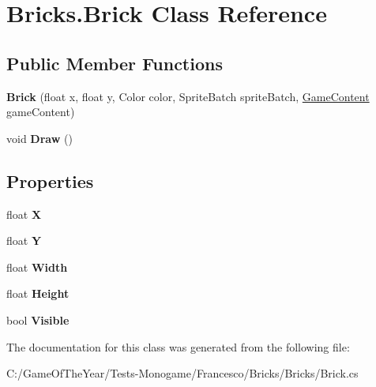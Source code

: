\hypertarget{class_bricks_1_1_brick}{}\section{Bricks.\+Brick Class Reference}
\label{class_bricks_1_1_brick}
\subsection*{Public Member Functions}
\begin{DoxyCompactItemize}
\item 
\mbox{\label{class_bricks_1_1_brick_ab67afcce321484d68712facf3a01e6d1}} 
{\bfseries Brick} (float x, float y, Color color, Sprite\+Batch sprite\+Batch, \mbox{\hyperlink{class_bricks_1_1_game_content}{Game\+Content}} game\+Content)
\item 
\mbox{\label{class_bricks_1_1_brick_a096850eb0e6b34dccc03fa82e26fc7e5}} 
void {\bfseries Draw} ()
\end{DoxyCompactItemize}
\subsection*{Properties}
\begin{DoxyCompactItemize}
\item 
\mbox{\label{class_bricks_1_1_brick_ad32b8576b81c39c29f036ae4899497c5}} 
float {\bfseries X}
\item 
\mbox{\label{class_bricks_1_1_brick_af39fbdf9515c40b8e0079a1ee31b9c31}} 
float {\bfseries Y}
\item 
\mbox{\label{class_bricks_1_1_brick_a95e8bf57566472909a1c2e2d78f7ddfd}} 
float {\bfseries Width}
\item 
\mbox{\label{class_bricks_1_1_brick_a72887db43fa21ed44f69d345ce44dee0}} 
float {\bfseries Height}
\item 
\mbox{\label{class_bricks_1_1_brick_ab106b50f7dce71c2fd35f1fce231019a}} 
bool {\bfseries Visible}
\end{DoxyCompactItemize}


The documentation for this class was generated from the following file\+:\begin{DoxyCompactItemize}
\item 
C\+:/\+Game\+Of\+The\+Year/\+Tests-\/\+Monogame/\+Francesco/\+Bricks/\+Bricks/Brick.\+cs\end{DoxyCompactItemize}
